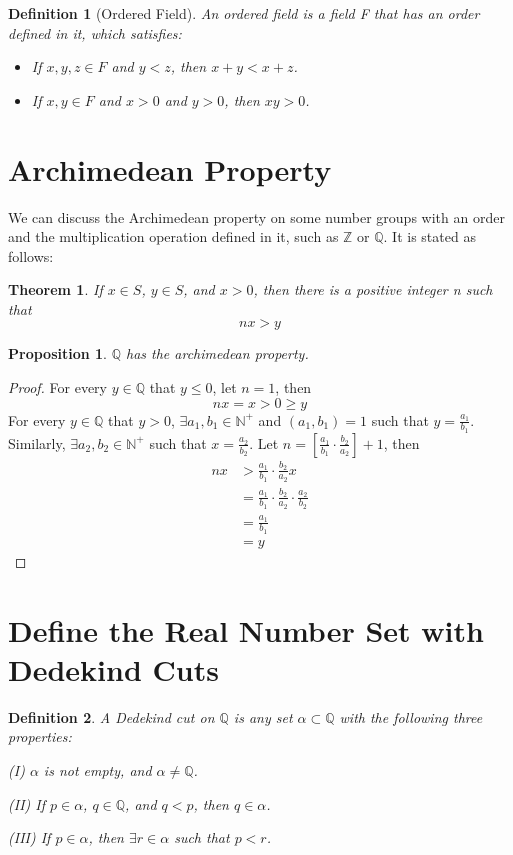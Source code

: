 \documentclass[onecolumn]{article}
\newtheorem{definition}{Definition}
\newtheorem{theorem}{Theorem}
\newtheorem{proposition}{Proposition}
\begin{document}
\begin{definition}[Ordered Field]
  An ordered field is a field F that has an order defined in it, which satisfies:
  \begin{itemize}
    \item If $x, y, z \in F$ and $y < z$, then $x + y < x + z$.
    \item If $x, y \in F$ and $x > 0$ and $y > 0$, then $xy > 0$.
  \end{itemize}
\end{definition}

\section{Archimedean Property}
We can discuss the Archimedean property on some number groups with an order and 
the multiplication operation defined in it, such as $\mathbb{Z}$ or $\mathbb{Q}$.
It is stated as follows:
\begin{theorem}
  If $x \in S$, $y \in S$, and $x > 0$, then there is a positive integer n such 
  that
  \[
    nx > y
  \]
\end{theorem}

\begin{proposition}
  $\mathbb{Q}$ has the archimedean property.
\end{proposition}
\begin{proof}
  For every $y \in \mathbb{Q}$ that $y \leq 0$, let $n = 1$, then
  \[
    nx = x > 0 \geq y
  \]
  For every $y \in \mathbb{Q}$ that $y > 0$, $\exists a_1, b_1 \in \mathbb{N^+}$ 
  and $(a_1, b_1) = 1$ such that $y = \frac{a_1}{b_1}$. Similarly, 
  $\exists a_2, b_2 \in \mathbb{N^+}$ such that $x = \frac{a_2}{b_2}$. Let 
  $n = [\frac{a_1}{b_1} \cdot \frac{b_2}{a_2}] + 1$, then
  \[
    \begin{split}
      nx &> \frac{a_1}{b_1} \cdot \frac{b_2}{a_2} x \\
         &= \frac{a_1}{b_1} \cdot \frac{b_2}{a_2} \cdot \frac{a_2}{b_2} \\
         &= \frac{a_1}{b_1} \\
         &= y
    \end{split}
  \]
\end{proof}

\section{Define the Real Number Set with Dedekind Cuts}

\begin{definition}
  A Dedekind cut on $\mathbb{Q}$ is any set $\alpha \subset \mathbb{Q}$ with the
  following three properties:
  \begin{description}
    \item{(I)} $\alpha$ is not empty, and $\alpha \neq \mathbb{Q}$.
    \item{(II)} If $p \in \alpha$, $q \in \mathbb{Q}$, and $q < p$, then 
    $q \in \alpha$.
    \item{(III)} If $p \in \alpha$, then $\exists r \in \alpha$ such that $p < r$.
  \end{description}
\end{definition}
\end{document}
